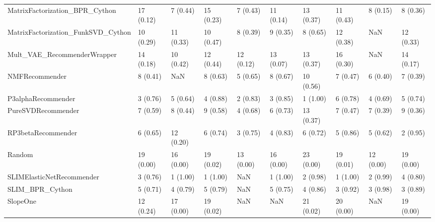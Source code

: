 \begin{tabular}{llllllllll}
     MatrixFactorization\_BPR\_Cython &                17 (0.12) &    7 (0.44) &     15 (0.23) &     7 (0.43) &            11 (0.14) &           13 (0.37) &         11 (0.43) &           8 (0.15) &          8 (0.36) \\
 MatrixFactorization\_FunkSVD\_Cython &                10 (0.29) &   11 (0.33) &     10 (0.47) &     8 (0.39) &             9 (0.35) &            8 (0.65) &         12 (0.38) &                NaN &         12 (0.33) \\
        Mult\_VAE\_RecommenderWrapper &                14 (0.18) &   10 (0.42) &     12 (0.44) &    12 (0.12) &            13 (0.07) &           13 (0.37) &         16 (0.30) &                NaN &         14 (0.17) \\
                     NMFRecommender &                 8 (0.41) &         NaN &      8 (0.63) &     5 (0.65) &             8 (0.67) &           10 (0.56) &          7 (0.47) &           6 (0.40) &          7 (0.39) \\
                 P3alphaRecommender &                 3 (0.76) &    5 (0.64) &      4 (0.88) &     2 (0.83) &             3 (0.85) &            1 (1.00) &          6 (0.78) &           4 (0.69) &          5 (0.74) \\
                 PureSVDRecommender &                 7 (0.59) &    8 (0.44) &      9 (0.58) &     4 (0.68) &             6 (0.73) &           13 (0.37) &          7 (0.47) &           7 (0.39) &          9 (0.36) \\
                 RP3betaRecommender &                 6 (0.65) &   12 (0.20) &      6 (0.74) &     3 (0.75) &             4 (0.83) &            6 (0.72) &          5 (0.86) &           5 (0.62) &          2 (0.95) \\
                             Random &                19 (0.00) &   16 (0.00) &     19 (0.02) &    13 (0.00) &            16 (0.00) &           23 (0.00) &         19 (0.01) &          12 (0.00) &         19 (0.00) \\
          SLIMElasticNetRecommender &                 3 (0.76) &    1 (1.00) &      1 (1.00) &          NaN &             1 (1.00) &            2 (0.98) &          1 (1.00) &           2 (0.99) &          4 (0.80) \\
                    SLIM\_BPR\_Cython &                 5 (0.71) &    4 (0.79) &      5 (0.79) &          NaN &             5 (0.75) &            4 (0.86) &          3 (0.92) &           3 (0.98) &          3 (0.89) \\
                           SlopeOne &                12 (0.24) &   17 (0.00) &     19 (0.02) &          NaN &                  NaN &           21 (0.02) &         20 (0.00) &                NaN &         19 (0.00) \\

\end{tabular}
